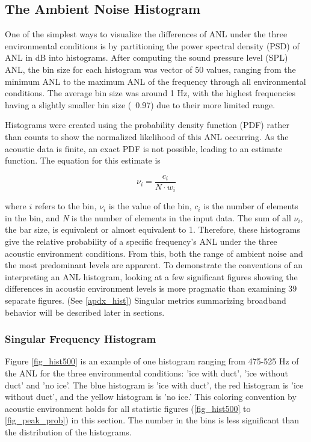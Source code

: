 \subsection{The Ambient Noise Histogram} \label{sec_hist}

One of the simplest ways to visualize the differences of ANL under the three environmental conditions is by partitioning the power spectral density (PSD) of ANL in dB into histograms. After computing the sound pressure level (SPL) ANL, the bin size for each histogram was vector of 50 values, ranging from the minimum ANL to the maximum ANL of the frequency through all environmental conditions. The average bin size was around 1 Hz, with the highest frequencies having a slightly smaller bin size (~0.97) due to their more limited range. %

Histograms were created using the probability density function (PDF) rather than counts to show the normalized likelihood of this ANL occurring. As the acoustic data is finite, an exact PDF is not possible, leading to an estimate function. The equation for this estimate is

\begin{equation} \label{eq:hist_pdf}
 \nu _{i}=\frac{c_{i}}{N \cdot w_{i}} 
\end{equation}

where $i$ refers to the bin, $\nu _{i}$ is the value of the bin, $c_{i}$ is the number of elements in the bin, and \textit{N} is the number of elements in the input data. The sum of all $\nu_{i}$, the bar size, is equivalent or almost equivalent to 1. Therefore, these histograms give the relative probability  of a specific frequency's ANL under the three acoustic environment conditions. From this, both the range of ambient noise and the most predominant levels are apparent. To demonstrate the conventions of an interpreting an ANL histogram, looking at a few significant figures showing the differences in acoustic environment levels is more pragmatic than examining 39 separate figures. (See \autoref{apdx_hist}) Singular metrics summarizing broadband behavior will be described later in sections.

\subsubsection{Singular Frequency Histogram}
Figure \ref{fig_hist500} is an example of one histogram ranging from 475-525 Hz of the ANL for the three environmental conditions: 'ice with duct',  'ice without duct' and 'no ice'.  The blue histogram is 'ice with duct', the red histogram is 'ice without duct', and the yellow histogram is 'no ice.'  This coloring convention by acoustic environment holds for all statistic figures (\autoref{fig_hist500} to \autoref{fig_peak_prob}) in this section. The number in the bins is less significant than the distribution of the histograms. 


